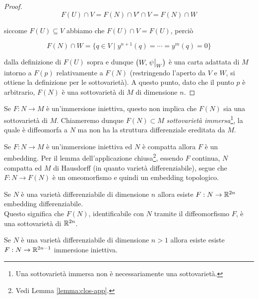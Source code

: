 \begin{proof}
	\begin{equation}
		F(U) \cap V = F(N) \cap V' \cap V = F(N) \cap W
	\end{equation}

	siccome $ F(U) \subseteq V $ abbiamo che $ F(U) \cap V = F(U) $, perciò
	
	\begin{equation}
		F(N) \cap W = \{ q \in V \mid y^{n+1}(q) = \cdots = y^{m}(q) = 0 \}
	\end{equation}

	dalla definizione di $ F(U) $ sopra e dunque $ \left( W,\eval{\psi}_{W} \right) $ è una carta adattata di $ M $ intorno a $ F(p) $ relativamente a $ F(N) $ (restringendo l'aperto da $ V $ e $ W $, si ottiene la definizione per le sottovarietà). A questo punto, dato che il punto $ p $ è arbitrario, $ F(N) $ è una sottovarietà di $ M $ di dimensione $ n $.
\end{proof}

\begin{remark}
	Se $ F : N \to M $ è un'immersione iniettiva, questo non implica che $ F(N) $ sia una sottovarietà di $ M $. Chiameremo dunque $ F(N) \subset M $ \textit{sottovarietà immersa}\footnote{%
		Una sottovarietà immersa non è necessariamente una sottovarietà.%
	}, la quale è diffeomorfa a $ N $ ma non ha la struttura differenziale ereditata da $ M $.
\end{remark}

\begin{remark}
	Se $ F : N \to M $ è un'immersione iniettiva ed $ N $ è compatta allora $ F $ è un embedding. Per il lemma dell'applicazione chiusa\footnote{%
		Vedi Lemma \ref{lemma:clos-app}.%
	}, essendo $ F $ continua, $ N $ compatta ed $ M $ di Hausdorff (in quanto varietà differenziabile), segue che $ F : N \to F(N) $ è un omeomorfismo e quindi un embedding topologico.
\end{remark}

\begin{theorem}[Whitney]
	Se $ N $ è una varietà differenziabile di dimensione $ n $ allora esiste $ F : N \to \mathbb{R}^{2n} $ embedding differenziabile. \\
	Questo significa che $ F(N) $, identificabile con $ N $ tramite il diffeomorfismo $ F $, è una sottovarietà di $ \mathbb{R}^{2n} $.
\end{theorem}

\begin{theorem}
	Se $ N $ è una varietà differenziabile di dimensione $ n>1 $ allora esiste esiste $ F : N \to \mathbb{R}^{2n-1} $ immersione iniettiva.
\end{theorem}

